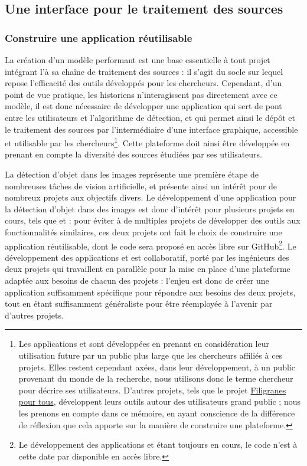 
\subsection{Une interface pour le traitement des sources}
    \subsubsection{Construire une application réutilisable}
    La création d'un modèle performant est une base essentielle à tout projet intégrant l'\ia à sa chaîne de traitement des sources : il s'agit du socle sur lequel repose l'efficacité des outils développés pour les chercheurs. Cependant, d'un point de vue pratique, les historiens n'interagissent pas directement avec ce modèle, il est donc nécessaire de développer une application qui sert de pont entre les utilisateurs et l'algorithme de détection, et qui permet ainsi le dépôt et le traitement des sources par l'intermédiaire d'une interface graphique, accessible et utilisable par les chercheurs\footnote{Les applications \eida et \vhs sont développées en prenant en considération leur utilisation future par un public plus large que les chercheurs affiliés à ces projets. Elles restent cependant axées, dans leur développement, à un public provenant du monde de la recherche, nous utilisons donc le terme \og chercheur \fg pour décrire ses utilisateurs. D'autres projets, tels que le projet \href{https://filigranes.hypotheses.org/}{Filigranes pour tous}, développent leurs outils autour des utilisateurs grand public ; nous les prenons en compte dans ce mémoire, en ayant conscience de la différence de réflexion que cela apporte sur la manière de construire une plateforme.}. Cette plateforme doit ainsi être développée en prenant en compte la diversité des sources étudiées par ses utilisateurs.
    
    La détection d'objet dans les images représente une première étape de nombreuses tâches de vision artificielle, et présente ainsi un intérêt pour de nombreux projets aux objectifs divers. Le développement d'une application pour la détection d'objet dans des images est donc d'intérêt pour plusieurs projets en cours, tels que \vhs et \eida : pour éviter à de multiples projets de développer des outils aux fonctionnalités similaires, ces deux projets ont fait le choix de construire une application réutilisable, dont le code sera proposé en accès libre sur GitHub\footnote{Le développement des applications \eida et \vhs étant toujours en cours, le code n'est à cette date par disponible en accès libre.}. Le développement des applications \eida et \vhs est collaboratif, porté par les ingénieurs des deux projets qui travaillent en parallèle pour la mise en place d'une plateforme adaptée aux besoins de chacun des projets : l'enjeu est donc de créer une application suffisamment spécifique pour répondre aux besoins des deux projets, tout en étant suffisamment généraliste pour être réemployée à l'avenir par d'autres projets.
    
